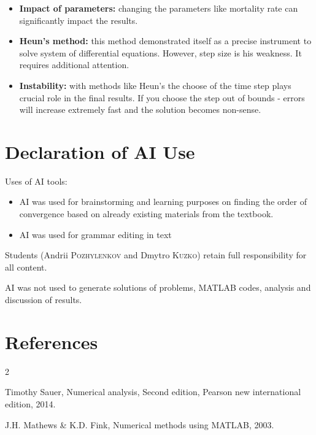 \documentclass{article}
\begin{document}
\begin{itemize}
    \item \textbf{Impact of parameters:} changing the parameters like mortality rate can significantly impact the results.
    \item \textbf{Heun's method:} this method demonstrated itself
    as a precise instrument to solve system of differential equations. However, step size is his weakness. It requires additional attention.
    \item \textbf{Instability:} with methods like Heun's the choose of the time step plays crucial role in the final results. If you choose the step out of bounds - errors will increase extremely fast and the solution becomes non-sense.
\end{itemize}

\newpage

\section*{Declaration of AI Use}

Uses of AI tools:
\begin{itemize}
    \item AI was used for brainstorming and learning purposes on finding the order of convergence based on already existing materials from the textbook.
    \item AI was used for grammar editing in text
\end{itemize}

Students (Andrii \textsc{Pozhylenkov} and Dmytro \textsc{Kuzko}) retain full responsibility for all content.

AI was not used to generate solutions of problems,
MATLAB codes, analysis and discussion of results.

\newpage

\section*{References}

\begin{thebibliography}{2}

Timothy Sauer, Numerical analysis, Second edition, Pearson new
international edition, 2014.

J.H. Mathews \& K.D. Fink, Numerical methods using MATLAB, 2003.

\end{thebibliography}
\end{document}
